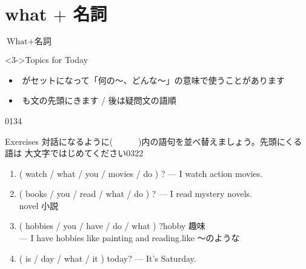 \documentclass[aspectratio=169,xcolor={dvipsnames,table}]{beamer}
\begin{document}
\section{what $+$ 名詞}
\begin{frame}[plain]{$\text{What} + \text{名詞}$}
\begin{enumerate}
\end{enumerate}

\begin{block}<3->{Topics for Today}
\pause
\begin{itemize}[square]\small
 \item {}\,\,がセットになって「何の〜、どんな～」の意味で使うことがあります
 \item {}\,\,も文の先頭にきます / 後は疑問文の語順
\end{itemize}
     \end{block}

\mbox{}\hfill{\tiny 0134}\,{\scriptsize {}}



\end{frame}
\begin{frame}[plain]{Exercises}
 対話になるように(~~~~~~)内の語句を並べ替えましょう。先頭にくる語は
大文字ではじめてください\hfill{\tiny 0322}\,{\scriptsize {}}

\begin{enumerate}
 \item ( watch / what / you / movies / do ) ? --- I watch action movies.\\
 \item ( books / you / read / what / do ) ? --- I read mystery novels.\\
\hfill{\scriptsize novel  小説}
 \item ( hobbies / you / have / do / what ) ?\hfill{}{\scriptsize hobby  趣味}\\
\mbox{}\hspace{20pt}--- I have hobbies like painting and reading.\hfill{}{\scriptsize like 〜のような}\\
 \item ( is / day / what / it )  today? --- It's Saturday.\\
\hfill{}
\end{enumerate}


\end{frame}
\end{document}
